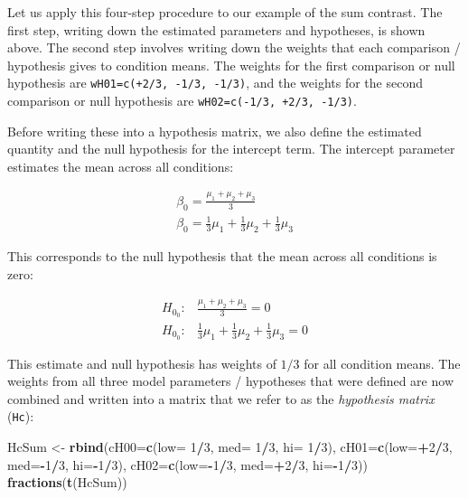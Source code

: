 \documentclass[12pt,]{krantz}
\newenvironment{Shaded}{\begin{snugshade}}{\end{snugshade}}
\newcommand{\DataTypeTok}[1]{\textcolor[rgb]{0.13,0.29,0.53}{#1}}
\newcommand{\DecValTok}[1]{\textcolor[rgb]{0.00,0.00,0.81}{#1}}
\newcommand{\KeywordTok}[1]{\textcolor[rgb]{0.13,0.29,0.53}{\textbf{#1}}}
\newcommand{\NormalTok}[1]{#1}
\newcommand{\OperatorTok}[1]{\textcolor[rgb]{0.81,0.36,0.00}{\textbf{#1}}}
\newcommand{\StringTok}[1]{\textcolor[rgb]{0.31,0.60,0.02}{#1}}
\theoremstyle{definition}
\theoremstyle{definition}
\theoremstyle{definition}
\theoremstyle{remark}
\begin{document}
Let us apply this four-step procedure to our example of the sum contrast. The first step, writing down the estimated parameters and hypotheses, is shown above. The second step involves writing down the weights that each comparison / hypothesis gives to condition means. The weights for the first comparison or null hypothesis are \texttt{wH01=c(+2/3,\ -1/3,\ -1/3)}, and the weights for the second comparison or null hypothesis are \texttt{wH02=c(-1/3,\ +2/3,\ -1/3)}.

Before writing these into a hypothesis matrix, we also define the estimated quantity and the null hypothesis for the intercept term. The intercept parameter estimates the mean across all conditions:

\begin{align}
\beta_0 = \frac{\mu_1 + \mu_2 + \mu_3}{3} \\
\beta_0 = \frac{1}{3} \mu_1 + \frac{1}{3}\mu_2 + \frac{1}{3}\mu_3
\end{align}

This corresponds to the null hypothesis that the mean across all conditions is zero:

\begin{align}
H_{0_0}: &\frac{\mu_1 + \mu_2 + \mu_3}{3} = 0 \\
H_{0_0}: &\frac{1}{3} \mu_1 + \frac{1}{3}\mu_2 + \frac{1}{3}\mu_3 = 0
\end{align}

This estimate and null hypothesis has weights of \(1/3\) for all condition means.
The weights from all three model parameters / hypotheses that were defined are now combined and written into a matrix that we refer to as the \emph{hypothesis matrix} (\texttt{Hc}):

\begin{Shaded}
\begin{Highlighting}[]
\NormalTok{HcSum <-}\StringTok{ }\KeywordTok{rbind}\NormalTok{(}\DataTypeTok{cH00=}\KeywordTok{c}\NormalTok{(}\DataTypeTok{low=} \DecValTok{1}\OperatorTok{/}\DecValTok{3}\NormalTok{, }\DataTypeTok{med=} \DecValTok{1}\OperatorTok{/}\DecValTok{3}\NormalTok{, }\DataTypeTok{hi=} \DecValTok{1}\OperatorTok{/}\DecValTok{3}\NormalTok{), }
               \DataTypeTok{cH01=}\KeywordTok{c}\NormalTok{(}\DataTypeTok{low=}\OperatorTok{+}\DecValTok{2}\OperatorTok{/}\DecValTok{3}\NormalTok{, }\DataTypeTok{med=}\OperatorTok{-}\DecValTok{1}\OperatorTok{/}\DecValTok{3}\NormalTok{, }\DataTypeTok{hi=}\OperatorTok{-}\DecValTok{1}\OperatorTok{/}\DecValTok{3}\NormalTok{), }
               \DataTypeTok{cH02=}\KeywordTok{c}\NormalTok{(}\DataTypeTok{low=}\OperatorTok{-}\DecValTok{1}\OperatorTok{/}\DecValTok{3}\NormalTok{, }\DataTypeTok{med=}\OperatorTok{+}\DecValTok{2}\OperatorTok{/}\DecValTok{3}\NormalTok{, }\DataTypeTok{hi=}\OperatorTok{-}\DecValTok{1}\OperatorTok{/}\DecValTok{3}\NormalTok{))}
\KeywordTok{fractions}\NormalTok{(}\KeywordTok{t}\NormalTok{(HcSum))}
\end{Highlighting}
\end{Shaded}
\end{document}
